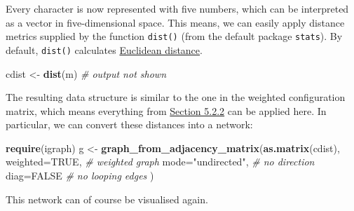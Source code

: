 \documentclass[]{book}
\newenvironment{Shaded}{\begin{snugshade}}{\end{snugshade}}
\newcommand{\CommentTok}[1]{\textcolor[rgb]{0.56,0.35,0.01}{\textit{#1}}}
\newcommand{\DataTypeTok}[1]{\textcolor[rgb]{0.13,0.29,0.53}{#1}}
\newcommand{\DecValTok}[1]{\textcolor[rgb]{0.00,0.00,0.81}{#1}}
\newcommand{\FloatTok}[1]{\textcolor[rgb]{0.00,0.00,0.81}{#1}}
\newcommand{\KeywordTok}[1]{\textcolor[rgb]{0.13,0.29,0.53}{\textbf{#1}}}
\newcommand{\NormalTok}[1]{#1}
\newcommand{\OperatorTok}[1]{\textcolor[rgb]{0.81,0.36,0.00}{\textbf{#1}}}
\newcommand{\OtherTok}[1]{\textcolor[rgb]{0.56,0.35,0.01}{#1}}
\newcommand{\StringTok}[1]{\textcolor[rgb]{0.31,0.60,0.02}{#1}}
\begin{document}
Every character is now represented with five numbers, which can be interpreted as a vector in five-dimensional space. This means, we can easily apply distance metrics supplied by the function \texttt{dist()} (from the default package \texttt{stats}). By default, \texttt{dist()} calculates \href{https://en.wikipedia.org/wiki/Euclidean_distance}{Euclidean distance}.

\begin{Shaded}
\begin{Highlighting}[]
\NormalTok{cdist <-}\StringTok{ }\KeywordTok{dist}\NormalTok{(m)}
\CommentTok{# output not shown}
\end{Highlighting}
\end{Shaded}

The resulting data structure is similar to the one in the weighted configuration matrix, which means everything from \protect\hyperlink{network}{Section 5.2.2} can be applied here.
In particular, we can convert these distances into a network:

\begin{Shaded}
\begin{Highlighting}[]
\KeywordTok{require}\NormalTok{(igraph)}
\NormalTok{g <-}\StringTok{ }\KeywordTok{graph_from_adjacency_matrix}\NormalTok{(}\KeywordTok{as.matrix}\NormalTok{(cdist), }
                                 \DataTypeTok{weighted=}\OtherTok{TRUE}\NormalTok{,     }\CommentTok{# weighted graph}
                                 \DataTypeTok{mode=}\StringTok{"undirected"}\NormalTok{, }\CommentTok{# no direction}
                                 \DataTypeTok{diag=}\OtherTok{FALSE}         \CommentTok{# no looping edges}
\NormalTok{                                )}
\end{Highlighting}
\end{Shaded}

This network can of course be visualised again.

\begin{Shaded}
\end{Shaded}
\end{document}
